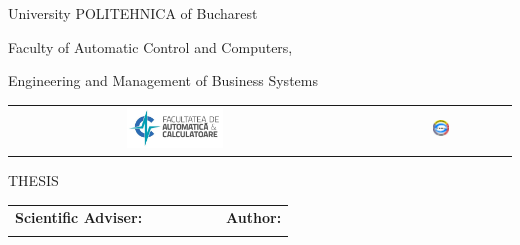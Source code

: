 \begin{titlepage}
	\begin{center}
		{\Large University POLITEHNICA of Bucharest}
		\par\vspace*{2mm}
		{\Large Faculty of Automatic Control and Computers,
		
		 Engineering and Management of Business Systems}
		\par\vspace*{3mm}
		\begin{table}[h]
        	\begin{center}
				\begin{tabular}{cccc}
                    \includegraphics[width=0.30\textwidth]{src/img/branding/acs}
					& & &
					\includegraphics[width=0.13\textwidth]{src/img/branding/cpru}
            	\end{tabular}
			\end{center}
		\end{table}
		
		\par\vspace*{35mm}
		{\Huge THESIS}
		\par\vspace*{15mm}
		{\Huge \VARtitleen}
		\par\vspace*{35mm}
		\begin{table}[h]
        	\begin{center}
				\begin{tabular}{lcccccl}
					\Large \textbf{\Large Scientific Adviser:}
					\vspace*{1mm} &&&&&& \Large \textbf{\Large Author:}\vspace*{1mm} \\
					\Large \VARadviser &&&&&& \Large \VARauthor
				\end{tabular}
			\end{center}
		\end{table}

		\par\vspace*{40mm}
		\Large \VARtitlefooteren
	\end{center}
\end{titlepage}
